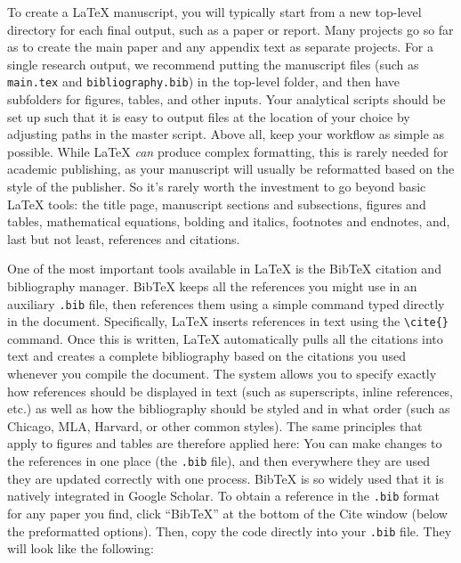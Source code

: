 To create a {\LaTeX} manuscript,
you will typically start from a new top-level directory for each final output,
such as a paper or report.
Many projects go so far as to create the main paper
and any appendix text as separate projects.
For a single research output, we recommend putting the manuscript files
(such as \texttt{main.tex} and \texttt{bibliography.bib})
in the top-level folder,
and then have subfolders for figures, tables, and other inputs.
Your analytical scripts should be set up such that it is easy to output files
at the location of your choice by adjusting paths in the master script.
Above all, keep your workflow as simple as possible.
While {\LaTeX} \textit{can} produce complex formatting,
this is rarely needed for academic publishing,
as your manuscript will usually be reformatted
based on the style of the publisher.
So it's rarely worth the investment to go beyond basic {\LaTeX} tools:
the title page, manuscript sections and subsections,
figures and tables, mathematical equations,
bolding and italics, footnotes and endnotes,
and, last but not least, references and citations.

One of the most important tools available in {\LaTeX}
is the BibTeX citation and bibliography manager.\cite{kopka1995guide}
BibTeX keeps all the references you might use in an auxiliary \texttt{.bib} file,
then references them using a simple command typed directly in the document.
Specifically, {\LaTeX} inserts references in text using the \texttt{\textbackslash cite\{\}} command.
Once this is written, {\LaTeX} automatically pulls all the citations into text
and creates a complete bibliography based on the citations you used whenever you compile the document.
The system allows you to specify exactly how references should be displayed in text
(such as superscripts, inline references, etc.)
as well as how the bibliography should be styled and in what order
(such as Chicago, MLA, Harvard, or other common styles).
The same principles that apply to figures and tables are therefore applied here:
You can make changes to the references in one place (the \texttt{.bib} file),
and then everywhere they are used they are updated correctly with one process.
BibTeX is so widely used that it is natively integrated in Google Scholar.
To obtain a reference in the \texttt{.bib} format for any paper you find,
click ``BibTeX'' at the bottom of the Cite window (below the preformatted options).
Then, copy the code directly into your \texttt{.bib} file.
They will look like the following:

